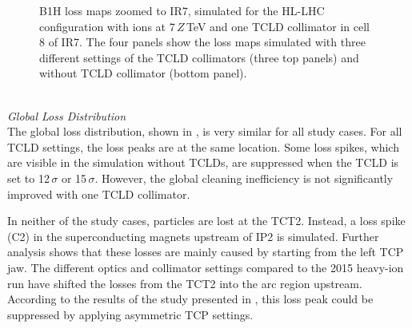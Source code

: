 \begin{figure}[p]
  \centering
  \caption{B1H loss maps zoomed to IR7, simulated for the HL-LHC configuration with \lead ions at 7$\,Z\,$TeV and one TCLD collimator in cell 8 of IR7. The four panels show the loss maps simulated with three different settings of the TCLD collimators (three top panels) and without TCLD collimator (bottom panel).}  
  \label{pic:16081104}
  \end{figure}






\mbox{} \\ 
\textit{Global Loss Distribution}\\ 
The global loss distribution, shown in , is very similar for all study cases. For all TCLD settings, the loss peaks are at the same location. Some loss spikes, which are visible in the simulation without TCLDs, are suppressed when the TCLD is set to 12$\,\sigma$ or 15$\,\sigma$. However, the global cleaning inefficiency is not significantly improved with one TCLD collimator. 

In neither of the study cases, particles are lost at the TCT2. Instead, a loss spike (C2) in the superconducting magnets upstream of IP2 is simulated. Further analysis shows that these losses are mainly caused by  starting from the left TCP jaw. The different optics and collimator settings compared to the 2015 heavy-ion run have shifted the losses from the TCT2 into the arc region upstream. According to the results of the study presented in , this loss peak could be suppressed by applying asymmetric TCP settings. 

